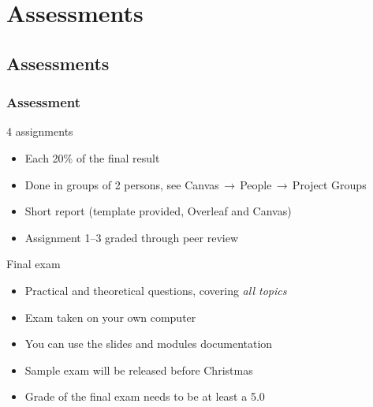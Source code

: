 \section{Assessments}
\subsection{Assessments}
{\nologo
\begin{frame}
 \frametitle{Assessment}
 \begin{block}{4 assignments}
  \begin{itemize}
    \item Each 20\% of the final result
    \item Done in groups of 2 persons, see Canvas$\,\to\,$People$\,\to\,$Project Groups
    \item Short report (template provided, Overleaf and Canvas)
    \item Assignment 1--3 graded through peer review
    \end{itemize}   
 \end{block}
 \pause
 \begin{block}{Final exam}
  \begin{itemize}
    \item Practical and theoretical questions, covering \emph{all topics}
    \item Exam taken on your own computer
    \item You can use the slides and modules documentation
    \item Sample exam will be released before Christmas
    \item Grade of the final exam needs to be at least a 5.0
  \end{itemize}   
 \end{block}
\end{frame}
}


